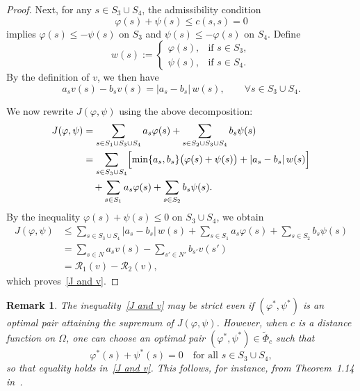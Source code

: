 \documentclass[12pt]{amsart}
\newtheorem{remark}{Remark}
\begin{document}
\begin{proof}
    Next, for any \( s \in S_3 \cup S_4 \), the admissibility condition
    \[
    \varphi(s) + \psi(s) \leq c(s, s) = 0
    \]
    implies \(\varphi(s) \le -\psi(s)\) on \(S_3\) and \(\psi(s) \le -\varphi(s)\) on \(S_4\). 
    Define
    \[
    w(s) := 
    \begin{cases}
    \varphi(s), & \text{if } s \in S_3,\\[0.2em]
    \psi(s),    & \text{if } s \in S_4.
    \end{cases}
    \]
    By the definition of \( v \), we then have
    \[
    a_s v(s) - b_s v(s) = |a_s - b_s|\, w(s), 
    \qquad \forall s \in S_3 \cup S_4.
    \]

    We now rewrite \(J(\varphi,\psi)\) using the above decomposition:
    \begin{align*}
    J(\varphi, \psi) 
    &= \sum_{s \in S_1 \cup S_3 \cup S_4} a_s \varphi(s)
    + \sum_{s \in S_2 \cup S_3 \cup S_4} b_s \psi(s) \\
    &= \sum_{s \in S_3 \cup S_4} 
        \Bigl[\min\{a_s, b_s\}\bigl(\varphi(s) + \psi(s)\bigr)
                + |a_s - b_s|\, w(s) \Bigr] \\
    &\quad + \sum_{s \in S_1} a_s \varphi(s)
            + \sum_{s \in S_2} b_s \psi(s).
    \end{align*}
    By the inequality \(\varphi(s)+\psi(s)\le 0\) on \(S_3\cup S_4\), we obtain
    \begin{align*}
    J(\varphi, \psi) 
    &\leq \sum_{s \in S_3 \cup S_4} |a_s - b_s|\, w(s)
        + \sum_{s \in S_1} a_s \varphi(s)
        + \sum_{s \in S_2} b_s \psi(s) \\
    &= \sum_{s \in N} a_s v(s) - \sum_{s' \in N'} b_{s'} v(s') \\
    &= \mathcal{R}_1(v) - \mathcal{R}_2(v),
    \end{align*}
    which proves~\eqref{J and v}.
\end{proof}

\begin{remark}
    The inequality~\eqref{J and v} may be strict even if \( (\varphi^*, \psi^*) \) is an optimal pair attaining the supremum of \( J(\varphi, \psi) \). 
    However, when \( c \) is a distance function on \( \Omega \), one can choose an optimal pair \( (\varphi^*, \psi^*) \in \widetilde{\Phi}_c \) such that
    \[
    \varphi^*(s) + \psi^*(s) = 0 
    \quad \text{for all } s \in S_3 \cup S_4,
    \]
    so that equality holds in~\eqref{J and v}. 
    This follows, for instance, from Theorem~1.14 in~\cite{villani2003topics}.
\end{remark}
\end{document}
